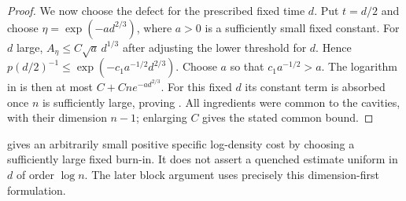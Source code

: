 \begin{proof}
We now choose the defect for the prescribed fixed time $d$.
Put $t=d/2$ and choose $\eta=\exp(-a d^{2/3})$, where $a>0$ is a
sufficiently small fixed constant.  For $d$ large,
$A_\eta\le C\sqrt a\,d^{1/3}$ after adjusting the lower threshold for
$d$.  Hence $p(d/2)^{-1}\le\exp(-c_1a^{-1/2}d^{2/3})$.
Choose $a$ so that $c_1a^{-1/2}>a$.  The logarithm in
 is then at most
$C+Cn e^{-a d^{2/3}}$.  For this fixed $d$ its constant term is absorbed
once $n$ is sufficiently large, proving .
All ingredients were common to the cavities, with their dimension $n-1$;
enlarging $C$ gives the stated common bound.
\end{proof}

\begin{remark}\label{rem:stat-order}
 gives an arbitrarily small positive specific
log-density cost by choosing a sufficiently large fixed burn-in.  It does
not assert a quenched estimate uniform in $d$ of order $\log n$.  The
later block argument uses precisely this dimension-first formulation.
\end{remark}
